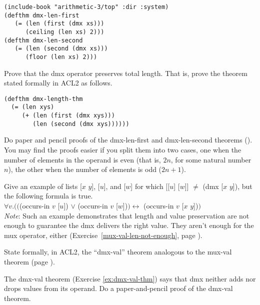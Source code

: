 \label{thm:dmx-length-first-second}
\begin{Verbatim}
(include-book "arithmetic-3/top" :dir :system)
(defthm dmx-len-first
   (= (len (first (dmx xs)))
      (ceiling (len xs) 2)))
(defthm dmx-len-second
   (= (len (second (dmx xs)))
      (floor (len xs) 2)))
\end{Verbatim}

\begin{ExerciseList}
\Exercise
Prove that the dmx operator preserves total length.
That is, prove the theorem
stated formally in ACL2 as follows.

\label{thm:dmx-length}
\begin{Verbatim}
(defthm dmx-length-thm
  (= (len xys)
     (+ (len (first (dmx xys)))
        (len (second (dmx xys))))))
\end{Verbatim}

\Exercise
Do paper and pencil proofs of the dmx-len-first and dmx-len-second
theorems (\pageref{thm:dmx-length-first-second}).
You may find the proofs easier if you split them into
two cases, one when the number of elements in the operand is even
(that is, $2n$, for some natural number $n$),
the other when the number of elements is odd ($2n+1$).

\Exercise\label{dmx-val-len-not-enough}
Give an example of lists [$x$ $y$], [$u$], and [$w$] for which 
[[$u$] [$w$]] $\neq$ (dmx [$x$ $y$]), but the following formula is true.\\
\hspace*{1cm}$\forall v.(($(occurs-in $v$ [$u$]) $\vee$ (occurs-in $v$ [$w$])$)
\leftrightarrow$ (occurs-in $v$ [$x$ $y$])$)$\\
\emph{Note}: Such an example demonstrates that length and value
preservation are not enough to guarantee the dmx delivers the right value.
They aren't enough for the mux operator, either 
(Exercise~\ref{mux-val-len-not-enough}, page \pageref{mux-val-len-not-enough}).

\Exercise [label={ex:dmx-val-thm}]
State formally, in ACL2, the ``dmx-val'' theorem
analogous to the mux-val theorem (page \pageref{defthm:mux-val}).

\Exercise
The dmx-val theorem (Exercise \ref{ex:dmx-val-thm})
says that dmx neither adds nor drops values from its operand.
Do a paper-and-pencil proof of the dmx-val theorem.


\end{ExerciseList}
